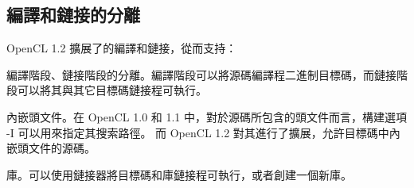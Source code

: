 \subsection{編譯和鏈接的分離}

OpenCL 1.2 擴展了的編譯和鏈接，從而支持：
\startigBase
\item 編譯階段、鏈接階段的分離。編譯階段可以將源碼編譯程二進制目標碼，而鏈接階段可以將其與其它目標碼鏈接程可執行。

\item 內嵌頭文件。在 OpenCL 1.0 和 1.1 中，對於源碼所包含的頭文件而言，構建選項 -I 可以用來指定其搜索路徑。
而 OpenCL 1.2 對其進行了擴展，允許目標碼中內嵌頭文件的源碼。

\item 庫。可以使用鏈接器將目標碼和庫鏈接程可執行，或者創建一個新庫。
\stopigBase



